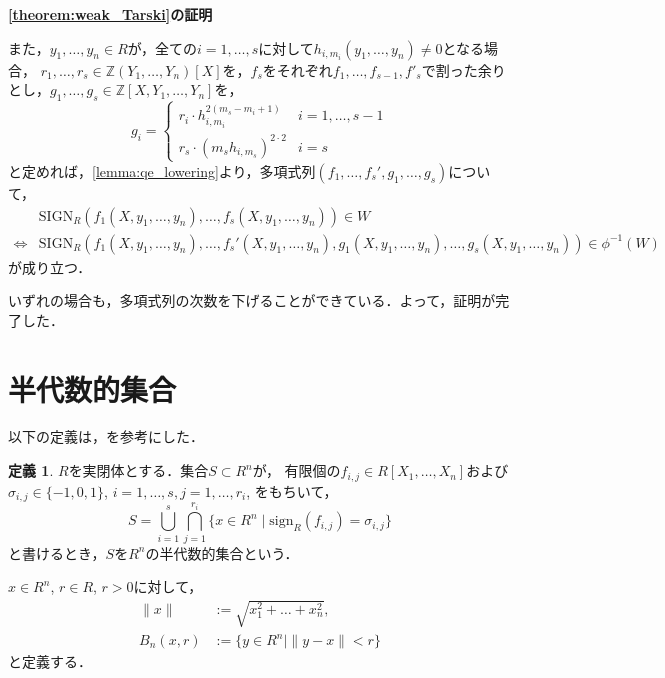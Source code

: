 \documentclass[uplatex, dvipdfmx]{jsarticle}
\makeatletter
\numberwithin{equation}{section}
\renewenvironment{proof}[1][\proofname]{\par
  \pushQED{\qed}%
  \normalfont \topsep6\p@\@plus6\p@\relax
  \trivlist
  \item\relax
  {\bfseries
  #1\@addpunct{.}}\hspace\labelsep\ignorespaces
}{
  \popQED\endtrivlist\@endpefalse
}
\newcommand{\Z}{\mathbb{Z}}
\newcommand{\sign}{\mathrm{sign}}
\newcommand{\SIGN}{\mathrm{SIGN}}
\newcommand{\norm}[1]{\| {#1} \|}
\theoremstyle{definition}
\newtheorem{definition}{定義}[section]
\renewcommand{\proofname}{\textbf{証明}}
\makeatother
\begin{document}
\begin{proof}[\cref{theorem:weak_Tarski}の証明]
     また，$y_1, \dots, y_n \in R$が，全ての$i=1, \dots, s$に対して$h_{i, m_i}(y_1, \dots, y_n) \neq 0$となる場合，
     $r_1, \dots, r_s \in \Z(Y_1, \dots, Y_n)[X]$を，$f_s$をそれぞれ$f_1, \dots, f_{s-1}, f'_s$で割った余りとし，$g_1, \dots, g_s \in \Z[X,Y_1, \dots, Y_n]$を，
     \begin{equation}
          g_i = \begin{cases}
               r_i \cdot h_{i,m_i}^{2(m_s-m_i+1)} & i=1, \dots, s-1\\
               r_s \cdot (m_s h_{i,m_s})^{2\cdot2} & i=s
          \end{cases}
     \end{equation}
     と定めれば，\cref{lemma:qe_lowering}より，多項式列$(f_1, \dots, f_s', g_1, \dots, g_s)$について，
     \begin{align}
          &\SIGN_R(f_1(X,y_1, \dots, y_n), \dots, f_s(X,y_1, \dots, y_n)) \in W\\
          \iff &\SIGN_R(f_1(X,y_1, \dots, y_n), \dots, f_s'(X,y_1, \dots, y_n),g_1(X,y_1, \dots, y_n), \dots, g_s(X,y_1, \dots, y_n)) \in \phi^{-1}(W)
     \end{align}
     が成り立つ．

     いずれの場合も，多項式列の次数を下げることができている．よって，証明が完了した．
\end{proof}

\section{半代数的集合}
以下の定義は，\cite[Definition 2.1.4.]{MR1659509}を参考にした．

\begin{definition}
     $R$を実閉体とする．集合$S \subset R^n$が，
     有限個の$f_{i,j} \in R[X_1, \dots, X_n]$および$\sigma_{i,j} \in \{-1, 0 ,1\}$, $i=1, \dots, s, j = 1, \dots, r_i$, をもちいて，
     \begin{equation}
          S = \bigcup_{i=1}^s \bigcap_{j=1}^{r_i} \{x \in R^n \mid \sign_R(f_{i,j}) = \sigma_{i,j}\}
     \end{equation}
     と書けるとき，$S$を$R^n$の半代数的集合という．
\end{definition}

$x \in R^n$, $r \in R$, $r>0$に対して，
\begin{align}
     \norm{x} &:= \sqrt{x_1^2 + \dots + x_n^2},\\
     B_n(x,r) &:= \{y \in R^n \mid \norm{y-x} < r\}
\end{align}
と定義する．
\end{document}
